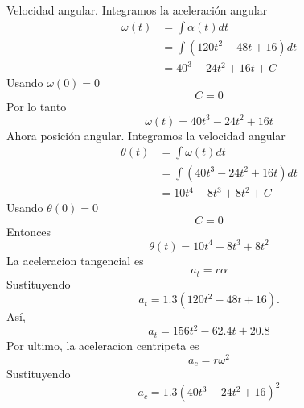 \documentclass[12pt,a4paper]{article}
\begin{document}
    \begin{solucion}
        Velocidad angular. Integramos la aceleración angular
        \begin{align*}
            \omega(t)&=\int\alpha(t)dt\\
            &=\int(120t^{2}-48t+16)dt\\
            &=40^{3}-24t^{2}+16t+C
        \end{align*}
        Usando $\omega(0)=0$
        \begin{equation*}
            C=0
        \end{equation*}
        Por lo tanto
        \begin{equation*}
            \omega(t)=40t^{3}-24t^{2}+16t
        \end{equation*}
        Ahora posición angular. Integramos la velocidad angular
        \begin{align*}
            \theta(t)&=\int\omega(t)dt\\
            &=\int(40t^{3}-24t^{2}+16t)dt\\
            &=10t^{4}-8t^{3}+8t^{2}+C
        \end{align*}
        Usando $\theta(0)=0$
        \begin{equation*}
            C=0
        \end{equation*}
        Entonces
        \begin{equation*}
            \theta(t)=10t^{4}-8t^{3}+8t^{2}
        \end{equation*}
        La aceleracion tangencial es
        \begin{equation*}
            a_{t}=r\alpha
        \end{equation*}
        Sustituyendo
        \begin{equation*}
            a_{t}=1.3(120t^{2}-48t+16).
        \end{equation*}
        Así,
        \begin{equation*}
            a_{t}=156t^{2}-62.4t+20.8
        \end{equation*}
        Por ultimo, la aceleracion centripeta es
        \begin{equation*}
            a_{c}=r\omega^{2}
        \end{equation*}
        Sustituyendo
        \begin{equation*}
            a_{c}=1.3(40t^{3}-24t^{2}+16)^{2}
        \end{equation*}
    \end{solucion}
\end{document}
